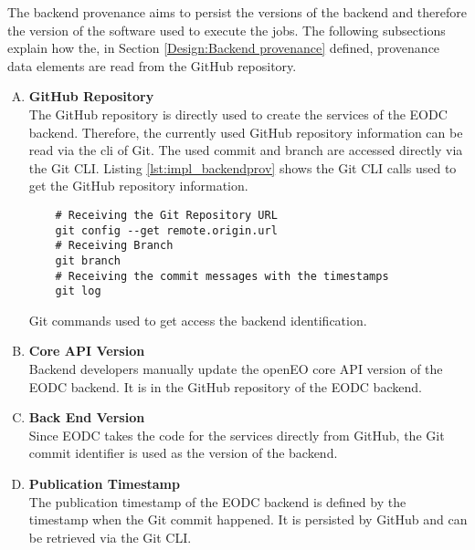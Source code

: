 \documentclass[draft,final]{vutinfth} %
\newenvironment{code}{\captionsetup{type=listing}}{}
\begin{document}
The backend provenance aims to persist the versions of the backend and therefore the version of the software used to execute the jobs. The following subsections explain how the, in Section \ref{Design:Backend provenance} defined, provenance data elements are read from the GitHub repository.   
\begin{enumerate}[(A)]
\item \textbf{GitHub Repository} \\
	The GitHub repository is directly used to create the services of the EODC backend. Therefore, the currently used GitHub repository information can be read via the \gls{cli} of Git. The used commit and branch are accessed directly via the Git CLI. Listing \ref{lst:impl_backendprov} shows the Git CLI calls used to get the GitHub repository information.       

\begin{code}
	\begin{verbatim}
	# Receiving the Git Repository URL
	git config --get remote.origin.url 
	# Receiving Branch
	git branch
	# Receiving the commit messages with the timestamps
	git log 
	\end{verbatim}
	\caption{Git commands used to get access the backend identification.}
	\label{lst:impl_backendprov}
\end{code}

\item \textbf{Core API Version} \\
	Backend developers manually update the openEO core API version of the EODC backend. It is in the GitHub repository of the EODC backend. 

\item \textbf{Back End Version} \\
	Since EODC takes the code for the services directly from GitHub, the Git commit identifier is used as the version of the backend.

\item \textbf{Publication Timestamp} \\
	The publication timestamp of the EODC backend is defined by the timestamp when the Git commit happened. It is persisted by GitHub and can be retrieved via the Git CLI. 
\end{enumerate}
\end{document}
